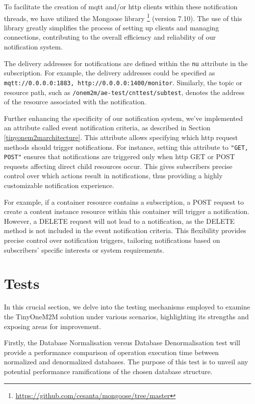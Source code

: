 \documentclass[a4paper,fleqn]{cas-dc}
\begin{document}
To facilitate the creation of \gls{mqtt} and/or \gls{http} clients within these notification threads, we have utilized the Mongoose library \footnote{\url{https://github.com/cesanta/mongoose/tree/master}} (version 7.10). The use of this library greatly simplifies the process of setting up clients and managing connections, contributing to the overall efficiency and reliability of our notification system.

The delivery addresses for notifications are defined within the \texttt{nu} attribute in the subscription. For example, the delivery addresses could be specified as \texttt{mqtt://0.0.0.0:1883, http://0.0.0.0:1400/monitor}. Similarly, the topic or resource path, such as \texttt{/onem2m/ae-test/cnttest/subtest}, denotes the address of the resource associated with the notification.

Further enhancing the specificity of our notification system, we've implemented an attribute called event notification criteria, as described in Section \ref{tinyonem2marchitecture}. This attribute allows specifying which \gls{http} request methods should trigger notifications. For instance, setting this attribute to \texttt{"GET, POST"} ensures that notifications are triggered only when \gls{http} GET or POST requests affecting direct child resources occur. This gives subscribers precise control over which actions result in notifications, thus providing a highly customizable notification experience. 

For example, if a container resource contains a subscription, a POST request to create a content instance resource within this container will trigger a notification. However, a DELETE request will not lead to a notification, as the DELETE method is not included in the event notification criteria. This flexibility provides precise control over notification triggers, tailoring notifications based on subscribers' specific interests or system requirements.

\section{Tests}
\label{tests}

In this crucial section, we delve into the testing mechanisms employed to examine the TinyOneM2M solution under various scenarios, highlighting its strengths and exposing areas for improvement.

Firstly, the Database Normalisation versus Database Denormalisation test will provide a performance comparison of operation execution time between normalized and denormalized databases. The purpose of this test is to unveil any potential performance ramifications of the chosen database structure.
\end{document}
